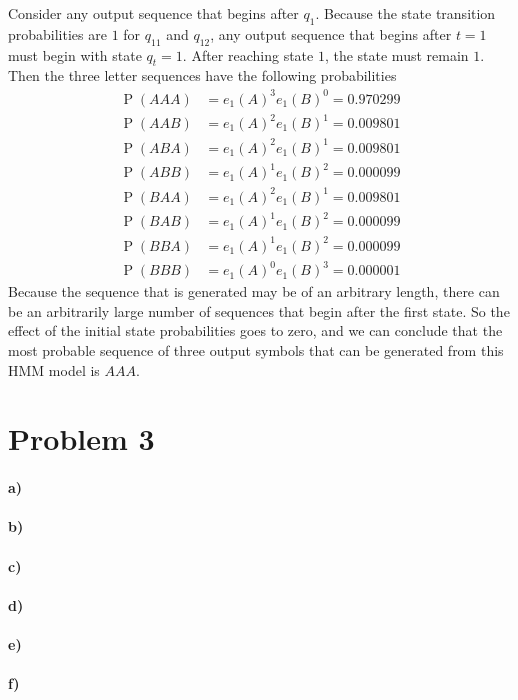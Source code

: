\documentclass[12pt]{article}
\begin{document}
Consider any output sequence that begins after \(q_1\). Because the state transition probabilities are \(1\) for \(q_{11}\)
and \(q_{12}\), any output sequence that begins after \(t=1\) must begin with state \(q_t=1\). After reaching state \(1\),
the state must remain \(1\). Then the three letter sequences have the following probabilities
\begin{align*}
        \operatorname{P}(AAA)&=e_1(A)^3e_1(B)^0=0.970299\\
        \operatorname{P}(AAB)&=e_1(A)^2e_1(B)^1=0.009801\\
        \operatorname{P}(ABA)&=e_1(A)^2e_1(B)^1=0.009801\\
        \operatorname{P}(ABB)&=e_1(A)^1e_1(B)^2=0.000099\\
        \operatorname{P}(BAA)&=e_1(A)^2e_1(B)^1=0.009801\\
        \operatorname{P}(BAB)&=e_1(A)^1e_1(B)^2=0.000099\\
        \operatorname{P}(BBA)&=e_1(A)^1e_1(B)^2=0.000099\\
        \operatorname{P}(BBB)&=e_1(A)^0e_1(B)^3=0.000001
\end{align*}
Because the sequence that is generated may be of an arbitrary length, there can be an arbitrarily large number of sequences that
begin after the first state. So the effect of the initial state probabilities goes to zero, and we can conclude that the most
probable sequence of three output symbols that can be generated from this HMM model is \(AAA\).

\section*{Problem 3}

\paragraph{a)}

\paragraph{b)}

\paragraph{c)}

\paragraph{d)}

\paragraph{e)}

\paragraph{f)}
\end{document}
